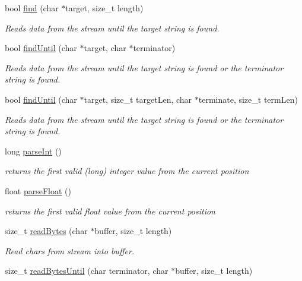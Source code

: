 \begin{DoxyCompactItemize}
bool \mbox{\hyperlink{class_stream_ad851401f2318cdb1de05707e021b81d9}{find}} (char $\ast$target, size\+\_\+t length)
\begin{DoxyCompactList}\small\item\em Reads data from the stream until the target string is found. \end{DoxyCompactList}\item 
bool \mbox{\hyperlink{class_stream_ad1f5f6600832396fb38a897baf4de35b}{find\+Until}} (char $\ast$target, char $\ast$terminator)
\begin{DoxyCompactList}\small\item\em Reads data from the stream until the target string is found or the terminator string is found. \end{DoxyCompactList}\item 
bool \mbox{\hyperlink{class_stream_a3a9497de614792103ab8cb4759e01a69}{find\+Until}} (char $\ast$target, size\+\_\+t target\+Len, char $\ast$terminate, size\+\_\+t term\+Len)
\begin{DoxyCompactList}\small\item\em Reads data from the stream until the target string is found or the terminator string is found. \end{DoxyCompactList}\item 
long \mbox{\hyperlink{class_stream_a497ffcbcb4d5bb889a8fde487bcc1b98}{parse\+Int}} ()
\begin{DoxyCompactList}\small\item\em returns the first valid (long) integer value from the current position \end{DoxyCompactList}\item 
float \mbox{\hyperlink{class_stream_a5e5a0cc11eb586d89dcb7fa8e53a87e8}{parse\+Float}} ()
\begin{DoxyCompactList}\small\item\em returns the first valid float value from the current position \end{DoxyCompactList}\item 
size\+\_\+t \mbox{\hyperlink{class_stream_a45fd1336a323ea83b16e8507055f44ea}{read\+Bytes}} (char $\ast$buffer, size\+\_\+t length)
\begin{DoxyCompactList}\small\item\em Read chars from stream into buffer. \end{DoxyCompactList}\item 
size\+\_\+t \mbox{\hyperlink{class_stream_af84672a4fb2620466958d3118d4fea00}{read\+Bytes\+Until}} (char terminator, char $\ast$buffer, size\+\_\+t length)

\end{DoxyCompactItemize}
